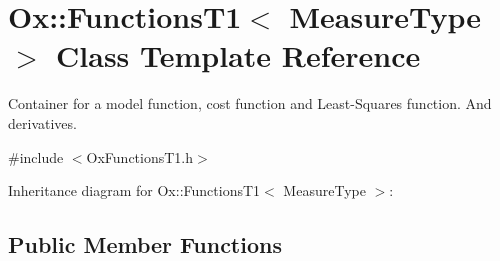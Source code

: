 \hypertarget{class_ox_1_1_functions_t1}{}\section{Ox\+:\+:Functions\+T1$<$ Measure\+Type $>$ Class Template Reference}
\label{class_ox_1_1_functions_t1}


Container for a model function, cost function and Least-\/\+Squares function. And derivatives.  




{\ttfamily \#include $<$Ox\+Functions\+T1.\+h$>$}



Inheritance diagram for Ox\+:\+:Functions\+T1$<$ Measure\+Type $>$\+:
\subsection*{Public Member Functions}

